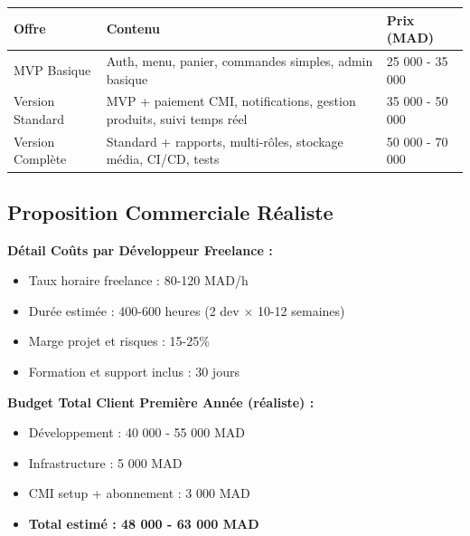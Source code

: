 \documentclass[11pt,a4paper]{article}
\begin{document}
\begin{longtable}{|p{4cm}|p{8cm}|p{3cm}|}
\hline
\textbf{Offre} & \textbf{Contenu} & \textbf{Prix (MAD)} \\
\hline
MVP Basique & Auth, menu, panier, commandes simples, admin basique & 25 000 - 35 000 \\
\hline
Version Standard & MVP + paiement CMI, notifications, gestion produits, suivi temps réel & 35 000 - 50 000 \\
\hline
Version Complète & Standard + rapports, multi-rôles, stockage média, CI/CD, tests & 50 000 - 70 000 \\
\hline
\end{longtable}

\subsection{Proposition Commerciale Réaliste}

\begin{center}
\end{center}

\textbf{Détail Coûts par Développeur Freelance :}
\begin{itemize}
    \item Taux horaire freelance : 80-120 MAD/h
    \item Durée estimée : 400-600 heures (2 dev × 10-12 semaines)
    \item Marge projet et risques : 15-25\%
    \item Formation et support inclus : 30 jours
\end{itemize}

\textbf{Budget Total Client Première Année (réaliste) :}
\begin{itemize}
    \item Développement : 40 000 - 55 000 MAD
    \item Infrastructure : 5 000 MAD
    \item CMI setup + abonnement : 3 000 MAD
    \item \textbf{Total estimé : 48 000 - 63 000 MAD}
\end{itemize}
\end{document}
